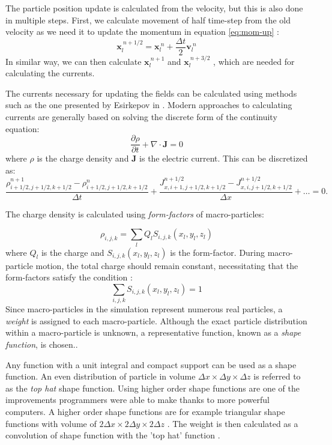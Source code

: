 The particle position update is calculated from the velocity, but this is also done in multiple steps. First, we calculate movement of half time-step from the old velocity as we need it to update the momentum in equation \ref{eq:mom-up} \cite{arber2015}:
\begin{equation}
	\bm{x}^{~n+1/2}_{l} = \bm{x}^{~n}_l + \frac{\Delta t}{2} \bm{v}^{~n}_l  
\end{equation}
In similar way, we can then calculate $\bm{x}^{~n+1}_l$ and $\bm{x}^{~n+3/2}_l$ \cite{arber2015}, which are needed for calculating the currents.

The currents necessary for updating the fields can be calculated using methods such as the one presented by Esirkepov in \cite{esirkepov2001}. Modern approaches to calculating currents are generally based on solving the discrete form of the continuity equation:
\begin{equation}
	\frac{\partial\rho}{\partial t} + \nabla \cdot \bm{J} = 0
	\label{eq:conti}
\end{equation} 
where $\rho$ is the charge density and $\bm{J}$ is the electric current. This can be discretized as:
\begin{equation}
	\frac{\rho^{n+1}_{i+1/2,j+1/2,k+1/2}-\rho^{n}_{i+1/2,j+1/2,k+1/2}}{\Delta t} + \frac{J^{n+1/2}_{x,i+1,j+1/2,k+1/2}-J^{n+1/2}_{x,i,j+1/2,k+1/2}}{\Delta x} + \dots = 0.
\end{equation}

The charge density is calculated using \textit{form-factors} of macro-particles:

\begin{equation}
	\rho_{i,j,k} = \sum_{l}Q_l S_{i,j,k}(x_l,y_l,z_l)
\end{equation}
where $Q_l$ is the charge and $S_{i,j,k}(x_l,y_l,z_l)$ is the form-factor. During macro-particle motion, the total charge should remain constant, necessitating that the form-factors satisfy the condition :
\begin{equation}
	\sum_{i,j,k}S_{i,j,k}(x_l,y_l,z_l) = 1
\end{equation}
Since macro-particles in the simulation represent numerous real particles, a \textit{weight} is assigned to each macro-particle. Although the exact particle distribution within a macro-particle is unknown, a representative function, known as a \textit{shape function}, is chosen.\cite{arber2015}. 

Any function with a unit integral and compact support can be used as a shape function. An even distribution of particle in volume $\Delta x \times \Delta y \times \Delta z$ is referred to as the \textit{top hat} shape function. Using higher order shape functions are one of the improvements programmers were able to make thanks to more powerful computers. A higher order shape functions are for example triangular shape functions with volume of $2\Delta x \times 2\Delta y \times 2\Delta z$  . The weight is then calculated as a convolution of shape function with the 'top hat' function \cite{arber2015}.


